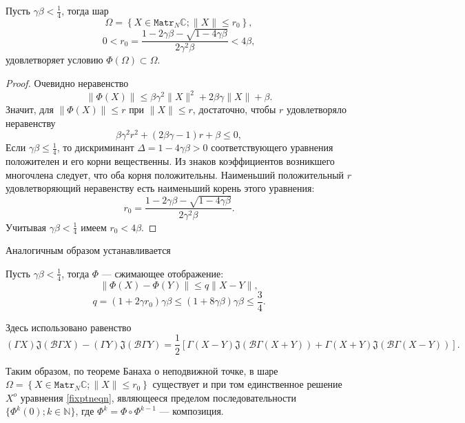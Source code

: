 \begin{lem}
    Пусть \( \gamma\beta < \frac14\),
    тогда шар
    \[
        \Omega = \left\{ X\in \mathtt{Matr}_N\mathbb{C}; \|X\| \leq r_0 \right\}, \]
    \[  0 < r_0 = \frac{1 - 2\gamma\beta - \sqrt{1-4\gamma\beta}}{2\gamma^2\beta} < 4\beta, \]
    удовлетворяет условию \( \Phi(\Omega)\subset\Omega \).
\end{lem}
\begin{proof}
Очевидно неравенство
    \[ \| \Phi(X) \| \leq
     \beta \gamma^2 \|X\|^2 + 2\beta\gamma\|X\| + \beta. \]
Значит, для \( \|\Phi(X)\| \leq r \) при \( \|X\| \leq r \),
    достаточно, чтобы \( r \) удовлетворяло неравенству
    \[ \beta \gamma^2 r^2 + (2\beta\gamma - 1)r + \beta \leq 0, \]
Если \( \gamma\beta \leq \frac14 \),
    то дискриминант \( \Delta = 1-4\gamma\beta > 0 \)
    соответствующего уравнения положителен и его корни вещественны.
Из знаков коэффициентов возникшего многочлена следует, что оба корня положительны.
Наименьший положительный \( r \) удовлетворяющий неравенству есть наименьший корень
этого уравнения:
    \[ r_0 = \frac{1 - 2\gamma\beta - \sqrt{1-4\gamma\beta}}{2\gamma^2\beta}. \]
Учитывая \( \gamma\beta<\frac14 \) имеем \( r_0 < 4\beta \).
\end{proof}

Аналогичным образом устанавливается
\begin{lem}
    Пусть \(\gamma\beta<\frac14\),
    тогда \( \Phi \) --- сжимающее отображение:
    \[ \| \Phi(X) - \Phi(Y) \| \leq q \|X - Y\|, \]
    \[ q = (1+2\gamma r_0) \gamma\beta \leq (1+8\gamma\beta)\gamma\beta \leq \frac34. \]
\end{lem}
Здесь использовано равенство
\[ (\Gamma X) \mathfrak{J}(\mathcal{B}\Gamma X) - (\Gamma Y) \mathfrak{J}(\mathcal{B}\Gamma Y) =
    \frac12\left[
        \Gamma(X-Y) \mathfrak{J}(\mathcal{B}\Gamma(X+Y))
    +   \Gamma(X+Y) \mathfrak{J}(\mathcal{B}\Gamma(X-Y))
    \right]. \]

Таким образом, по теореме Банаха о неподвижной точке,
в шаре \( \Omega = \left\{ X\in\mathtt{Matr}_N\mathbb{C}; \|X\| \leq r_0 \right\} \)
существует и при том единственное решение \( X^o \) уравнения \eqref{fixptneqn},
являющееся пределом последовательности \( \{ \Phi^k(0); k\in\mathbb{N} \} \),
где \( \Phi^k = \Phi\circ\Phi^{k-1} \) --- композиция.

